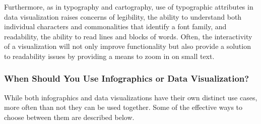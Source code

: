 \documentclass[]{book}
\begin{document}
Furthermore, as in typography and cartography, use of typographic
attributes in data visualization raises concerns of legibility, the
ability to understand both individual characters and commonalities that
identify a font family, and readability, the ability to read lines and
blocks of words. Often, the interactivity of a visualization will not
only improve functionality but also provide a solution to readability
issues by providing a means to zoom in on small text.

\subsubsection{When Should You Use Infographics or Data
Visualization?}\label{when-should-you-use-infographics-or-data-visualization-1}

While both infographics and data visualizations have their own distinct
use cases, more often than not they can be used together. Some of the
effective ways to choose between them are described below.
\end{document}
